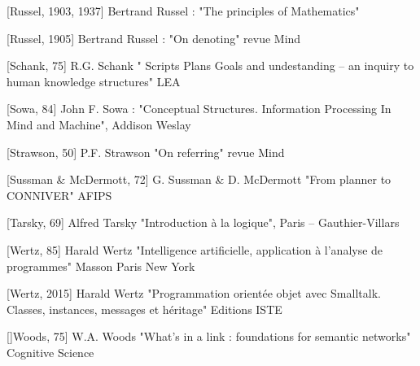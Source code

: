 \documentclass[a4paper, 12pt, openright, french]{book}
\begin{document}
{[}Russel, 1903, 1937{]} Bertrand Russel : "The principles of
Mathematics"

{[}Russel, 1905{]} Bertrand Russel : "On denoting" revue Mind

{[}Schank, 75{]} R.G. Schank " Scripts Plans Goals and undestanding --
an inquiry to human knowledge structures" LEA

{[}Sowa, 84{]} John F. Sowa : "Conceptual Structures. Information
Processing In Mind and Machine", Addison Weslay

{[}Strawson, 50{]} P.F. Strawson "On referring" revue Mind

{[}Sussman \& McDermott, 72{]} G. Sussman \& D. McDermott "From planner
to CONNIVER" AFIPS

{[}Tarsky, 69{]} Alfred Tarsky "Introduction à la logique", Paris --
Gauthier-Villars

{[}Wertz, 85{]} Harald Wertz "Intelligence artificielle, application à
l'analyse de programmes" Masson Paris New York

{[}Wertz, 2015{]} Harald Wertz "Programmation orientée objet avec Smalltalk. Classes, instances, messages et héritage" Editions ISTE 

{[}{]}Woods, 75{]} W.A. Woods "What's in a link :
foundations for semantic networks" Cognitive Science
\end{document}
